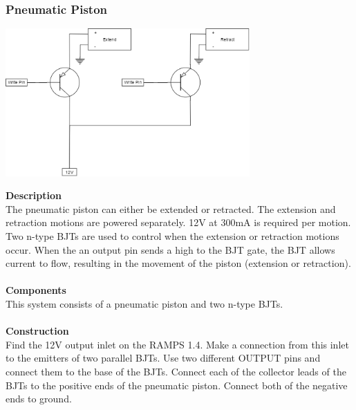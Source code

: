 \documentclass[titlepage]{article}
\begin{document}
\subsubsection{Pneumatic Piston}
\begin{center}
	\includegraphics[width = 0.7\textwidth]{PneumaticPiston.png}
\label{fig:PneumaticPistonFig}
\end{center}
\textbf{Description}\\
The pneumatic piston can either be extended or retracted. The extension and retraction motions are powered separately. 12V at 300mA is required per motion. Two n-type BJTs are used to control when the extension or retraction motions occur. When the an output pin sends a high to the BJT gate, the BJT allows current to flow, resulting in the movement of the piston (extension or retraction).\\\\
\textbf{Components}\\
This system consists of a pneumatic piston and two n-type BJTs.\\\\
\textbf{Construction}\\
Find the 12V output inlet on the RAMPS 1.4. Make a connection from this inlet to the emitters of two parallel BJTs. Use two different OUTPUT pins and connect them to the base of the BJTs. Connect each of the collector leads of the BJTs to the positive ends of the pneumatic piston. Connect both of the negative ends to ground.
\end{document}
